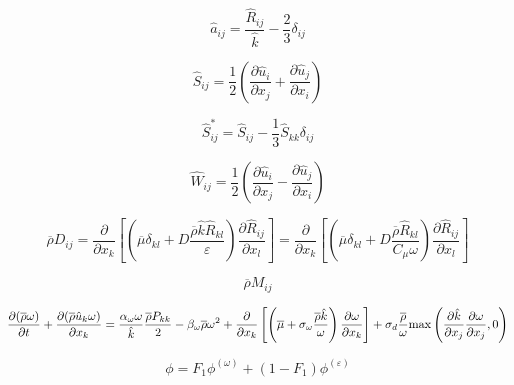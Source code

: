 \begin{equation}
\hat a_{ij} = \frac{\hat R_{ij}}{\hat k} - \frac{2}{3} \delta_{ij}
\end{equation}

\begin{equation}
\hat S_{ij} = \frac{1}{2} \left( \frac{\partial \hat u_i}{\partial x_j} +
\frac{\partial \hat u_j}{\partial x_i} \right)
\end{equation}

\begin{equation}
\hat S_{ij}^* = \hat S_{ij} - \frac{1}{3} \hat S_{kk} \delta_{ij}
\end{equation}

\begin{equation}
\hat W_{ij} = \frac{1}{2} \left( \frac{\partial \hat u_i}{\partial x_j} -
\frac{\partial \hat u_j}{\partial x_i} \right)
\end{equation}

\begin{equation}
\overline \rho D_{ij} = \frac{\partial}{\partial x_k}
\left[ \left( \overline \mu \delta_{kl} + D \frac{\overline \rho \hat k \hat R_{kl}}{\varepsilon}
\right) \frac{\partial \hat R_{ij}}{\partial x_l} \right]
= \frac{\partial}{\partial x_k}
\left[ \left( \overline \mu \delta_{kl} + D \frac{\overline \rho \hat R_{kl}}{C_{\mu} \omega}
\right) \frac{\partial \hat R_{ij}}{\partial x_l} \right]
\end{equation}

\begin{equation}
\overline \rho M_{ij}
\end{equation}

\begin{equation}
\frac{\partial (\overline \rho \omega)}{\partial t} +
  \frac{\partial (\overline \rho \hat u_k \omega)}{\partial x_k}
  = \frac{\alpha_{\omega} \omega}{\hat k} \frac{\overline \rho P_{kk}}{2} -
  \beta_{\omega} \overline \rho \omega^2 + \frac{\partial}{\partial x_k}
  \left[ \left( \overline \mu + \sigma_{\omega} \frac{\overline \rho \hat k}{\omega} \right)
  \frac{\partial \omega}{\partial x_k} \right] +
  \sigma_d \frac{\overline \rho}{\omega} {\rm max} \left( \frac{\partial \hat k}{\partial x_j}
  \frac{\partial \omega}{\partial x_j}, 0 \right)
\end{equation}

\begin{equation}
\phi = F_1 \phi^{(\omega)} + (1-F_1) \phi^{(\varepsilon)}
\end{equation}

